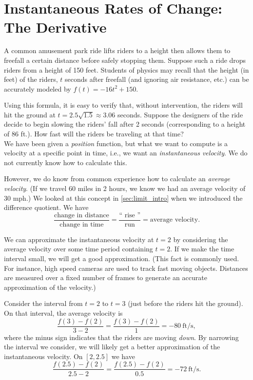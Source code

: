\section{Instantaneous Rates of Change: The Derivative}\label{sec:derivative}

A common amusement park ride lifts riders to a height then allows them to freefall a certain distance before safely stopping them. Suppose such a ride drops riders from a height of 150 feet. Students of physics may recall that the height (in feet) of the riders, $t$ seconds after freefall (and ignoring air resistance, etc.) can be accurately modeled by $f(t) = -16t^2+150$. 

Using this formula, it is easy to verify that, without intervention, the riders will hit the ground at $t=2.5\sqrt{1.5} \approx 3.06$ seconds. Suppose the designers of the ride decide to begin slowing the riders' fall after 2 seconds (corresponding to a height of 86 ft.). How fast will the riders be traveling at that time?\\

We have been given a \textit{position} function, but what we want to compute is a velocity at a specific point in time, i.e., we want an \textit{instantaneous velocity}. We do not currently know how to calculate this.

However, we do know from common experience how to calculate an \textit{average velocity}. (If we travel 60 miles in 2 hours, we know we had an average velocity of 30 mph.) We looked at this concept in \autoref{sec:limit_intro} when we introduced the difference quotient. We have 
	$$\frac{\text{change in distance}}{\text{change in time}} = \frac{\text{``\ rise\ ''}}{\text{run}} = \text{average velocity}.$$
	
We can approximate the instantaneous velocity at $t=2$ by considering the average velocity over some time period containing $t=2$. If we make the time interval small, we will get a good approximation. (This fact is commonly used. For instance, high speed cameras are used to track fast moving objects. Distances are measured over a fixed number of frames to generate an accurate approximation of the velocity.)

Consider the interval from $t=2$ to $t=3$ (just before the riders hit the ground). On that interval, the average velocity is 
		$$\frac{f(3)-f(2)}{3-2} = \frac{f(3)-f(2)}{1} =-80\ \text{ft/s},$$
where the minus sign indicates that the riders are moving \textit{down}. By narrowing the interval we consider, we will likely get a better approximation of the instantaneous velocity. On $[2,2.5]$ we have 
	$$\frac{f(2.5)-f(2)}{2.5-2} = \frac{f(2.5)-f(2)}{0.5} =-72\ \text{ft/s}.$$

